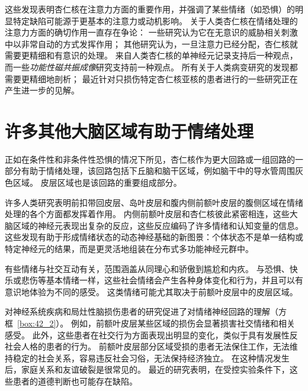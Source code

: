 这些发现表明杏仁核在注意力方面的重要作用，并强调了某些情绪（如恐惧）的明显特定缺陷可能源于更基本的注意力或动机影响。
关于人类杏仁核在情绪处理的注意力方面的确切作用一直存在争论：
一些研究认为它在无意识的威胁相关刺激中以非常自动的方式发挥作用；
其他研究认为，一旦注意力已经分配，杏仁核就需要更精细和有意识的处理。
来自人类杏仁核的单神经元记录支持后一种观点，而一些\textit{功能性磁共振成像}研究支持前一种观点。
所有关于人类病变研究的发现都需要更精细地剖析；
最近针对只损伤特定杏仁核亚核的患者进行的一些研究正在产生进一步的见解。



\section{许多其他大脑区域有助于情绪处理}

正如在条件性和非条件性恐惧的情况下所见，杏仁核作为更大回路或一组回路的一部分有助于情绪处理，该回路包括下丘脑和脑干区域，例如脑干中的导水管周围灰色区域。
皮层区域也是该回路的重要组成部分。


许多人类研究表明前扣带回皮层、岛叶皮层和腹内侧前额叶皮层的腹侧区域在情绪处理的各个方面都发挥着作用。
内侧前额叶皮层和杏仁核彼此紧密相连，这些大脑区域的神经元表现出复杂的反应，这些反应编码了许多情绪和认知变量的信息。
这些发现有助于形成情绪状态的动态神经基础的新图景：个体状态不是单一结构或特定神经元的结果，而是更灵活地组装在分布式多功能神经元群中。


有些情绪与社交互动有关，范围涵盖从同理心和骄傲到尴尬和内疚。
与恐惧、快乐或悲伤等基本情绪一样，这些社会情绪会产生各种身体变化和行为，并且可以有意识地体验为不同的感受。
这类情绪可能尤其取决于前额叶皮层中的皮层区域。


对神经系统疾病和局灶性脑损伤患者的研究促进了对情绪神经回路的理解（方框~\ref{box:42_2}）。
例如，前额叶皮层某些区域的损伤会显著损害社交情绪和相关感受。
此外，这些患者在社交行为方面表现出明显的变化，类似于具有发展性反社会人格的患者的行为。
前额叶皮层部分区域受损的患者无法保住工作，无法维持稳定的社会关系，容易违反社会习俗，无法保持经济独立。
在这种情况发生后，家庭关系和友谊破裂是很常见的。
最近的研究表明，在受控实验条件下，这些患者的道德判断也可能存在缺陷。


